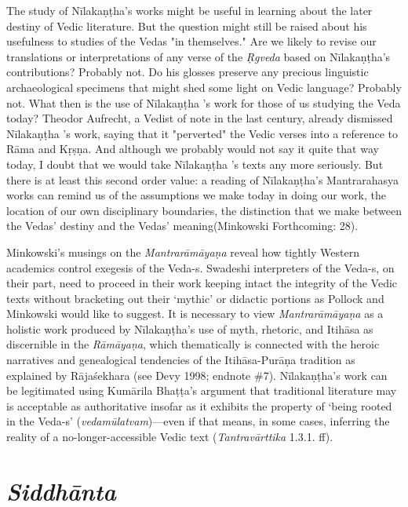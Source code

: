 \begin{myquote}
The study of Nīlakaṇṭha's works might be useful in learning about the later destiny of Vedic literature. But the question might still be raised about his usefulness to studies of the Vedas "in themselves." Are we likely to revise our translations or interpretations of any verse of the \textit{Ṛgveda} based on Nīlakaṇṭha's contributions? Probably not. Do his glosses preserve any precious linguistic archaeological specimens that might shed some light on Vedic language? Probably not. What then is the use of Nīlakaṇṭha 's work for those of us studying the Veda today? Theodor Aufrecht, a Vedist of note in the last century, already dismissed Nīlakaṇṭha 's work, saying that it "perverted" the Vedic verses into a reference to Rāma and Kṛṣṇa. And although we probably would not say it quite that way today, I doubt that we would take Nīlakaṇṭha 's texts any more seriously. But there is at least this second order value: a reading of Nīlakaṇṭha's Mantrarahasya works can remind us of the assumptions we make today in doing our work, the location of our own disciplinary boundaries, the distinction that we make between the Vedas' destiny and the Vedas' meaning\hfill (Minkowski Forthcoming: 28).
\end{myquote}

Minkowski’s musings on the \textit{Mantrarāmāyaṇa} reveal how tightly Western academics control exegesis of the Veda-s. Swadeshi interpreters of the Veda-s, on their part, need to proceed in their work keeping intact the integrity of the Vedic texts without bracketing out their ‘mythic’ or didactic portions as Pollock and Minkowski would like to suggest. It is necessary to view \textit{Mantrarāmāyaṇa} as a holistic work produced by Nīlakaṇṭha’s use of myth, rhetoric, and Itihāsa as discernible in the \textit{Rāmāyaṇa}, which thematically is connected with the heroic narratives and genealogical tendencies of the Itihāsa-Purāṇa tradition as explained by Rājaśekhara (see Devy 1998; endnote \#7). Nīlakaṇṭha’s work can be legitimated using Kumārila Bhaṭṭa’s argument that traditional literature may is acceptable as authoritative insofar as it exhibits the property of ‘being rooted in the Veda-s’ (\textit{vedamūlatvam})—even if that means, in some cases, inferring the reality of a no-longer-accessible Vedic text (\textit{Tantravārttika} 1.3.1. ff).


\section*{\textit{Siddhānta}}

